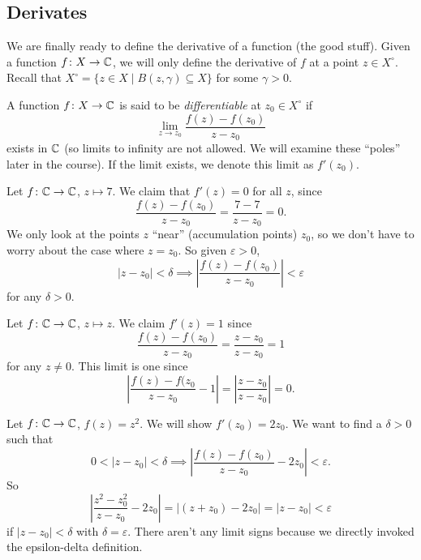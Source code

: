 \subsection{Derivates}
We are finally ready to define the derivative of a function (the good stuff). Given a function $f \colon X \to \mathbb{C}$, we will only define the derivative of $f$ at a point $z\in X^{\circ}$. Recall that $X^{\circ}=\{z\in X \mid B(z,\gamma)\subseteq X\}$ for some $\gamma> 0$.
\begin{definition}
    A function $f \colon X \to \mathbb{C}$ is said to be \emph{differentiable} at $z_0\in X^{\circ}$ if \[
        \lim_{z\to z_0}\frac{f(z)-f(z_0)}{z-z_0}
    \]
    exists in $\mathbb{C}$ (so limits to infinity are not allowed. We will examine these ``poles'' later in the course). If the limit exists, we denote this limit as $f'(z_0)$.
\end{definition}
\begin{example}
    Let  $f \colon \mathbb{C} \to \mathbb{C}$, $z \mapsto 7$. We claim that $f'(z)=0$ for all $z$, since \[
        \frac{f(z)-f(z_0)}{z-z_0}=\frac{7-7}{z-z_0}=0.
    \]We only look at the points $z$ ``near'' (accumulation points) $z_0$, so we don't have to worry about the case where $z=z_0$. So given $\varepsilon > 0$, \[
    |z-z_0|<\delta \implies \left| \frac{f(z)-f(z_0)}{z-z_0} \right| < \varepsilon
    \]
    for any $\delta > 0$.
\end{example}
\begin{example}
    Let $f \colon  \mathbb{C} \to \mathbb{C}$, $z \mapsto z$. We claim $f'(z)=1$ since \[
        \frac{f(z)-f(z_0)}{z-z_0}=\frac{z-z_0}{z-z_0}=1
    \]
    for any $z \neq 0$. This limit is one since \[
        \left| \frac{f(z)-f(z_0}{z-z_0}-1 \right| = \left| \frac{z-z_0}{z-z_0} \right| =0.
    \]
\end{example}
\begin{example}
    Let $f \colon  \mathbb{C} \to \mathbb{C}$, $f(z)=z^2.$ We will show $f'(z_0)=2z_0$. We want to find a $\delta>0$ such that \[
        0<|z-z_0|<\delta \implies \left| \frac{f(z)-f(z_0)}{z-z_0}-2z_0 \right| <\varepsilon.
    \]
   So 
   \begin{equation*}
       \left| \frac{z^2-z_0^2}{z-z_0}-2z_0 \right| =\left| (z+z_0)-2z_0 \right| =|z-z_0|<\varepsilon
   \end{equation*} if $|z-z_0|<\delta$ with $\delta=\varepsilon$.
  There aren't any limit signs because we directly invoked the epsilon-delta definition. 
\end{example}
